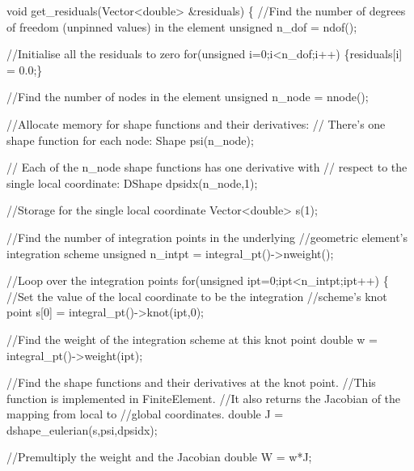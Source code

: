 \begin{DoxyCodeInclude}
  \textcolor{keywordtype}{void} get\_residuals(Vector<double> &residuals)
   \{
    \textcolor{comment}{//Find the number of degrees of freedom (unpinned values) in the element}
    \textcolor{keywordtype}{unsigned} n\_dof = ndof();

    \textcolor{comment}{//Initialise all the residuals to zero}
    \textcolor{keywordflow}{for}(\textcolor{keywordtype}{unsigned} i=0;i<n\_dof;i++) \{residuals[i] = 0.0;\}
    
    \textcolor{comment}{//Find the number of nodes in the element}
    \textcolor{keywordtype}{unsigned} n\_node = nnode();

    \textcolor{comment}{//Allocate memory for shape functions and their derivatives:}
    \textcolor{comment}{// There's one shape function for each node:}
    Shape psi(n\_node);

    \textcolor{comment}{// Each of the n\_node shape functions has one derivative with }
    \textcolor{comment}{// respect to the single local coordinate:}
    DShape dpsidx(n\_node,1);

    \textcolor{comment}{//Storage for the single local coordinate}
    Vector<double> s(1);
    
    \textcolor{comment}{//Find the number of integration points in the underlying }
    \textcolor{comment}{//geometric element's integration scheme }
    \textcolor{keywordtype}{unsigned} n\_intpt = integral\_pt()->nweight();

    \textcolor{comment}{//Loop over the integration points}
    \textcolor{keywordflow}{for}(\textcolor{keywordtype}{unsigned} ipt=0;ipt<n\_intpt;ipt++)
     \{
      \textcolor{comment}{//Set the value of the local coordinate to be the integration }
      \textcolor{comment}{//scheme's knot point}
      s[0] = integral\_pt()->knot(ipt,0);

      \textcolor{comment}{//Find the weight of the integration scheme at this knot point}
      \textcolor{keywordtype}{double} w = integral\_pt()->weight(ipt);

      \textcolor{comment}{//Find the shape functions and their derivatives at the knot point. }
      \textcolor{comment}{//This function is implemented in FiniteElement.}
      \textcolor{comment}{//It also returns the Jacobian of the mapping from local to }
      \textcolor{comment}{//global coordinates.}
      \textcolor{keywordtype}{double} J = dshape\_eulerian(s,psi,dpsidx);

      \textcolor{comment}{//Premultiply the weight and the Jacobian}
      \textcolor{keywordtype}{double} W = w*J;
      

\end{DoxyCodeInclude}
